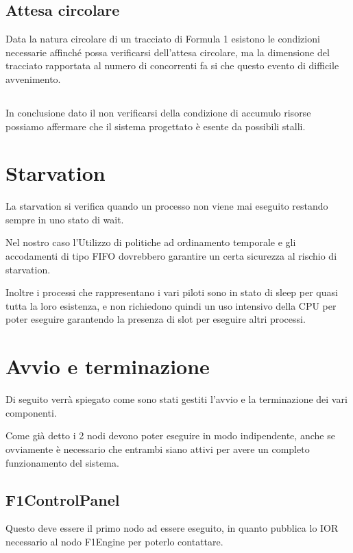\documentclass[a4paper,11pt, twoside]{book}
\begin{document}
      \subsection{Attesa circolare}
        Data la natura circolare di un tracciato di Formula 1 esistono le condizioni necessarie affinché possa verificarsi 
	dell'attesa circolare, ma la dimensione del tracciato rapportata al numero di concorrenti fa si che questo 
	evento di difficile avvenimento.
      
      \subsection*{}
	In conclusione dato il non verificarsi della condizione di accumulo risorse possiamo affermare che il sistema
	progettato è esente da possibili stalli.    
    
    \section{Starvation}
      La starvation si verifica quando un processo non viene mai eseguito restando sempre in uno stato di wait.
      
      Nel nostro caso l'Utilizzo di politiche ad ordinamento temporale e gli accodamenti di tipo FIFO dovrebbero
      garantire un certa sicurezza al rischio di starvation.
      
      Inoltre i processi che rappresentano i vari piloti sono in stato di sleep per quasi tutta la loro esistenza,
      e non richiedono quindi un uso intensivo della CPU per poter eseguire garantendo la presenza di slot per
      eseguire altri processi.
    
    \section{Avvio e terminazione}
      Di seguito verrà spiegato come sono stati gestiti l'avvio e la terminazione dei vari componenti.
      
      Come già detto i 2 nodi devono poter eseguire in modo indipendente, anche se ovviamente
      è necessario che entrambi siano attivi per avere un completo funzionamento del sistema.
      
      \subsection{F1ControlPanel}
        Questo deve essere il primo nodo ad essere eseguito, in quanto pubblica lo IOR necessario al nodo F1Engine
	per poterlo contattare.
	
\end{document}
